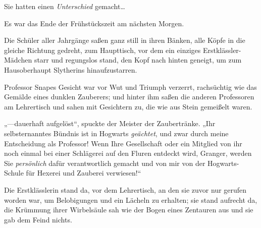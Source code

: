 Sie hatten einen \emph{Unterschied} gemacht…

\later

Es war das Ende der Frühstückszeit am nächsten Morgen.

Die Schüler aller Jahrgänge saßen ganz still in ihren Bänken, alle Köpfe in die gleiche Richtung gedreht, zum Haupttisch, vor dem ein einziges Erstklässler-Mädchen starr und regungslos stand, den Kopf nach hinten geneigt, um zum Hausoberhaupt Slytherins hinaufzustarren.

Professor Snapes Gesicht war vor Wut und Triumph verzerrt, rachsüchtig wie das Gemälde eines dunklen Zauberers; und hinter ihm saßen die anderen Professoren am Lehrertisch und sahen mit Gesichtern zu, die wie aus Stein gemeißelt waren.

„—dauerhaft aufgelöst“, spuckte der Meister der Zaubertränke. „Ihr selbsternanntes Bündnis ist in Hogwarts \emph{geächtet}, und zwar durch meine Entscheidung als Professor! Wenn Ihre Gesellschaft oder ein Mitglied von ihr noch einmal bei einer Schlägerei auf den Fluren entdeckt wird, Granger, werden Sie \emph{persönlich} dafür verantwortlich gemacht und von mir von der Hogwarts-Schule für Hexerei und Zauberei verwiesen!“

Die Erstklässlerin stand da, vor dem Lehrertisch, an den sie zuvor nur gerufen worden war, um Belobigungen und ein Lächeln zu erhalten; sie stand aufrecht da, die Krümmung ihrer Wirbelsäule sah wie der Bogen eines Zentauren aus und sie gab dem Feind nichts.

